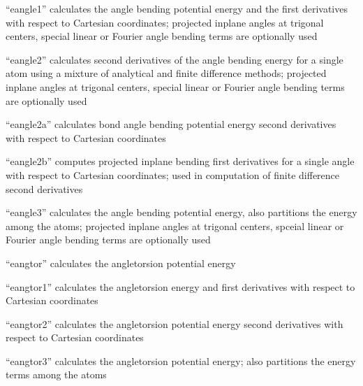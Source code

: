 \documentclass[letterpaper,11pt,english]{sphinxmanual}
\begin{document}

“eangle1” calculates the angle bending potential energy and
the first derivatives with respect to Cartesian coordinates;
projected in\sphinxhyphen{}plane angles at trigonal centers, special linear
or Fourier angle bending terms are optionally used


“eangle2” calculates second derivatives of the angle bending
energy for a single atom using a mixture of analytical and
finite difference methods; projected in\sphinxhyphen{}plane angles at trigonal
centers, special linear or Fourier angle bending terms are
optionally used


“eangle2a” calculates bond angle bending potential energy
second derivatives with respect to Cartesian coordinates


“eangle2b” computes projected in\sphinxhyphen{}plane bending first derivatives
for a single angle with respect to Cartesian coordinates;
used in computation of finite difference second derivatives


“eangle3” calculates the angle bending potential energy, also
partitions the energy among the atoms; projected in\sphinxhyphen{}plane
angles at trigonal centers, spceial linear or Fourier angle
bending terms are optionally used


“eangtor” calculates the angle\sphinxhyphen{}torsion potential energy


“eangtor1” calculates the angle\sphinxhyphen{}torsion energy and first
derivatives with respect to Cartesian coordinates


“eangtor2” calculates the angle\sphinxhyphen{}torsion potential energy
second derivatives with respect to Cartesian coordinates


“eangtor3” calculates the angle\sphinxhyphen{}torsion potential energy;
also partitions the energy terms among the atoms

\end{document}
